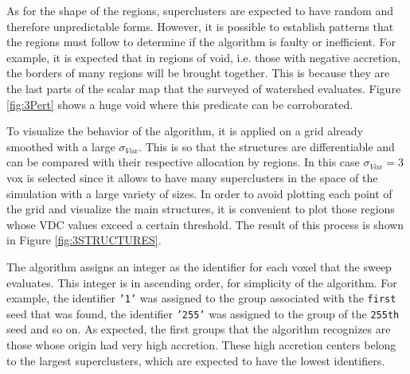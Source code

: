 \documentclass[a4paper,fleqn,usenatbib]{mnras}
\begin{document}
As for the shape of the regions, superclusters are expected to have random and therefore unpredictable forms. However, it is possible to establish patterns that the regions must follow to determine if the algorithm is faulty or inefficient. For example, it is expected that in regions of void, i.e. those with negative accretion, the borders of many regions will be brought together. This is because they are the last parts of the scalar map that the surveyed of watershed evaluates. Figure \ref{fig:3Pert} shows a huge void where this predicate can be corroborated.


To visualize the behavior of the algorithm, it is applied on a grid already smoothed with a large $\sigma_{Vox}$. This is so that the structures are differentiable and can be compared with their respective allocation by regions. In this case $\sigma_{Vox} = 3$ vox is selected since it allows to have many superclusters in the space of the simulation with a large variety of sizes. In order to avoid plotting each point of the grid and visualize the main structures, it is convenient to plot those regions whose VDC values exceed a certain threshold. The result of this process is shown in Figure \ref{fig:3STRUCTURES}.

The algorithm assigns an integer as the identifier for each voxel that the sweep evaluates. This integer is in ascending order, for simplicity of the algorithm. For example, the identifier \texttt{'1'} was assigned to the group associated with the \texttt{first} seed that was found, the identifier \texttt{'255'} was assigned to the group of the \texttt{255th} seed and so on. As expected, the first groups that the algorithm recognizes are those whose origin had very high accretion. These high accretion centers belong to the largest superclusters, which are expected to have the lowest identifiers.
\end{document}
